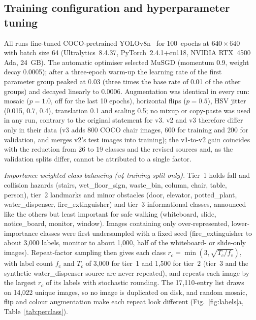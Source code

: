 \documentclass[3p,times,procedia]{elsarticle}
\DeclareRobustCommand{\rev}[1]{{\hlattr=1 #1}}
\DeclareRobustCommand{\rev}[1]{\hl{#1}}
\DeclareRobustCommand{\rev}[1]{#1}
\begin{document}
\subsection{Training configuration and hyperparameter tuning}
\label{sec:training}

All runs fine-tuned COCO-pretrained YOLOv8n~\cite{jocher2023yolov8} for
100~epochs at $640 \times 640$ with batch size 64 (Ultralytics~8.4.37,
PyTorch~2.4.1+cu118, NVIDIA RTX~4500 Ada, 24~GB). The automatic optimiser
selected MuSGD (momentum 0.9, weight decay 0.0005); after a three-epoch
warm-up the learning rate of the first parameter group peaked at 0.03 (three
times the base rate of 0.01 of the other groups) and decayed linearly to
0.0006. Augmentation was identical in every run: mosaic ($p=1.0$, off for
the last 10 epochs), horizontal flips ($p=0.5$), HSV jitter (0.015, 0.7,
0.4), translation 0.1 and scaling 0.5; \rev{no mixup or copy-paste was used in
any run, contrary to the original statement for v3}. v2 and v3 therefore
differ only in their data (v3 adds 800 COCO chair images, 600 for training
and 200 for validation, and merges v2's test images into training); the
v1-to-v2 gain coincides with the reduction from 26 to 19 classes and the
revised sources and, as the validation splits differ, cannot be attributed
to a single factor.

\emph{\rev{Importance-weighted class balancing (v4 training split only).}} Tier~1
holds fall and collision hazards (stairs, wet\_floor\_sign, waste\_bin,
column, chair, table, person), tier~2 landmarks and minor obstacles (door,
elevator, potted\_plant, water\_dispenser, fire\_extinguisher) and tier~3
informational classes, announced like the others but least important for
safe walking (whiteboard, slide, notice\_board, monitor, window). \rev{Images
containing only over-represented, lower-importance classes were first
undersampled with a fixed seed} (fire\_extinguisher to about 3,000 labels,
monitor to about 1,000, half of the whiteboard- or slide-only images).
Repeat-factor sampling then gives each class
$r_c = \min\left(3, \sqrt{T_c / f_c}\right)$, with label count $f_c$ and
$T_c$ of 3,000 for tier~1 and 1,500 for tier~2 (tier~3 and the synthetic
water\_dispenser source are never repeated), and repeats each image by the
largest $r_c$ of its labels with stochastic rounding. The 17,110-entry list
draws on 14,022 unique images, so no image is duplicated on disk, and
random mosaic, flip and colour augmentation make each repeat look different
(Fig.~\ref{fig:labels}a, Table~\ref{tab:perclass}).
\end{document}
